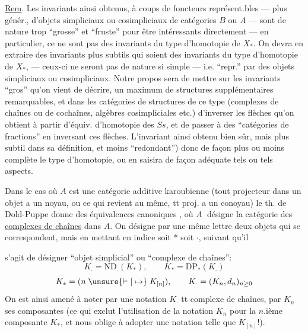 \uline{Rem}. Les  invariants ainsi obtenus,
à coups de foncteurs représent.bles --- plus génér., d'objets simpliciaux
ou cosimpliciaux de catégories $B$ ou $A$ --- sont de nature trop
``grosse'' et ``fruste'' pour être intéressants directement --- en
particulier, ce ne sont pas des invariants du type d'homotopie de $X_*$.
On devra en extraire des invariants plus subtils qui soient des invariants
du type d'homotopie de $X_*$, --- ceux-ci ne seront pas de nature si simple
--- i.e. ``repr.'' par des objets simpliciaux ou cosimpliciaux.
Notre propos sera de mettre sur les invariants ``gros'' qu'on vient de décrire,
un maximum de structures supplémentaires remarquables, et dans les catégories
de structures de ce type (complexes de chaînes ou de cochaînes, algèbres
cosimpliciales etc.) d'inverser les flèches qu'on obtient à partir d'équiv.
d'homotopie des $Ss$, et de passer à des ``catégories de fractions'' en
inversant ces flèches. L'invariant ainsi obtenu
bien sûr, mais plus subtil dans sa définition, et moins ``redondant'')
 donc de façon plus ou moins complète le type
d'homotopie, ou en saisira de façon adéquate tels ou tels aspects.

Dans le cas où $A$ est une catégorie additive karoubienne (tout projecteur
dans un objet a un noyau, ou ce qui revient au même, tt proj. a un conoyau)
le th. de Dold-Puppe donne des équivalences canoniques
,
où $A_{\cdot}$ désigne la catégorie des \uline{complexes de chaînes}
dans $A$. On désigne par une même lettre  deux objets
qui se correspondent, mais en mettant en indice soit $*$ soit $\cdot$,
suivant qu'il

s'agit de désigner  ``objet simplicial'' ou ``complexe de chaînes'':
\[
 K_{\cdot}=\mathrm{ND}_{\cdot}(K_*),\qquad K_*=\mathrm{DP}_*(K_{\cdot})
\]
\[
 K_*=(n\mathrel{\unsure{\vdash|\mapsto}}K_{[n]}),\qquad
 K_{\cdot}=(K_n,d_n)_{n\geq0}
\]
On est ainsi amené à noter par une notation $K_{\cdot}$ tt complexe de chaînes,
par $K_n$ ses composantes (ce qui exclut l'utilisation de la notation $K_n$
pour la $n$.ième composante  $K_*$, et nous oblige à adopter
une notation telle que $K_{[n]}$!).

